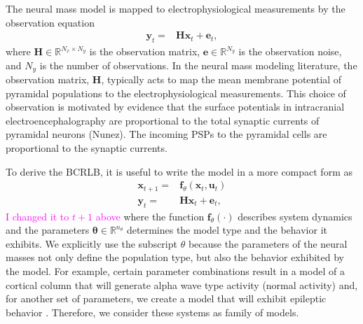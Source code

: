 \documentclass{article}
\renewcommand{\vec}[1]{\ensuremath{{\boldsymbol #1}}}
\newcommand{\unit}[1]{\textcolor{magenta}{#1}}
\begin{document}
The neural mass model is mapped to electrophysiological measurements by the observation equation
\begin{align}
	\mathbf{y}_t =& \mathbf{H}\mathbf{x}_t + \mathbf{e}_t,
\end{align}
where $\mathbf{H}\in \mathbb{R}^{N_x \times N_y}$ is the observation matrix, $\mathbf{e}\in \mathbb{R}^{N_y}$ is the observation noise, and $N_y$ is the number of observations. In the neural mass modeling literature, the observation matrix, $\mathbf{H}$, typically acts to map the mean membrane potential of pyramidal populations to the electrophysiological measurements. This choice of observation is motivated by evidence that the surface potentials in intracranial electroencephalography are proportional to the total synaptic currents of pyramidal neurons (Nunez). The incoming PSPs to the pyramidal cells are proportional to the synaptic currents.

To derive the BCRLB, it is useful to write the model in a more compact form as
\begin{align}\label{eq:NeuralMassModel}
    \mathbf{x}_{t+1} =& \vec f_{\theta}\left(\mathbf{x}_t,\mathbf{u}_t\right)\\
    \mathbf{y}_t =& \mathbf{H}\mathbf{x}_t + \mathbf{e}_t,
\end{align}
\unit{I changed it to $t+1$ above}
where the function $\vec f_{\theta}(\cdot)$ describes system dynamics and the parameters $\boldsymbol{\theta} \in \mathbb{R}^{n_{\theta}}$ determines the model type and the behavior it exhibits. 
We explicitly use the subscript $\theta$ because the parameters of the neural masses not only define the population type, but also the behavior exhibited by the model. For example, certain parameter combinations result in a model of a cortical column that will generate alpha wave type activity (normal activity) and, for another set of parameters, we create a model that will exhibit epileptic behavior \cite{Wendling2002}. Therefore, we consider these systems as family of models. 
\end{document}
